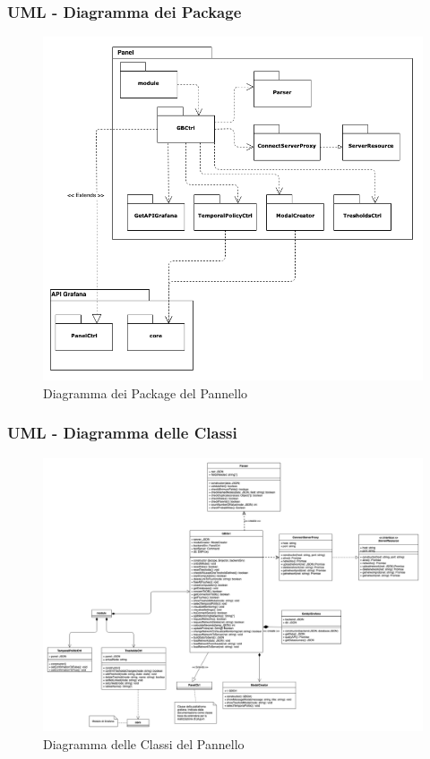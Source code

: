 \subsubsection{UML - Diagramma dei Package}
\begin{figure}[H]
\begin{center}
	\includegraphics[scale=0.6]{./images/panelPackage.png} 
\end{center}
\caption{Diagramma dei Package del Pannello}
\end{figure}

\begin{landscape}
\subsubsection{UML - Diagramma delle Classi}
\begin{figure}[H]
	\begin{center}
		\includegraphics[scale=0.27]{./images/panelClassi.png} 
	\end{center}
	\caption{Diagramma delle Classi del Pannello}
\end{figure}
\end{landscape}


